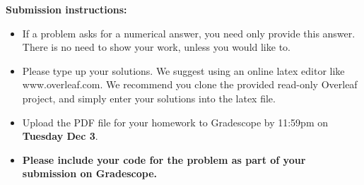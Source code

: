 \documentclass[10pt]{report}
\begin{document}
\lecturer{}
\scribe{}
\maketitle

\noindent
{\bf Submission instructions:} 
\begin{itemize}
\item If a problem asks for a numerical answer, you need only provide this answer. There is no need to show your work, unless you would like to.
\item Please type up your solutions. We suggest using an online latex editor like www.overleaf.com. We recommend you clone the provided read-only Overleaf project, and simply enter your solutions into the latex file.
\item Upload the PDF file for your homework to Gradescope by 11:59pm on {\bf Tuesday Dec 3}.
\item {\bf Please include your code for the problem as part of your submission on Gradescope.}
\end{itemize}

\vspace{.1in}
\end{document}
